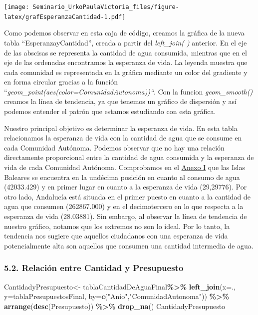 \documentclass[
]{article}
\newenvironment{Shaded}{\begin{snugshade}}{\end{snugshade}}
\newcommand{\AttributeTok}[1]{\textcolor[rgb]{0.13,0.29,0.53}{#1}}
\newcommand{\FunctionTok}[1]{\textcolor[rgb]{0.13,0.29,0.53}{\textbf{#1}}}
\newcommand{\NormalTok}[1]{#1}
\newcommand{\OtherTok}[1]{\textcolor[rgb]{0.56,0.35,0.01}{#1}}
\newcommand{\SpecialCharTok}[1]{\textcolor[rgb]{0.81,0.36,0.00}{\textbf{#1}}}
\newcommand{\StringTok}[1]{\textcolor[rgb]{0.31,0.60,0.02}{#1}}
\begin{document}
\texttt{[image: Seminario\_UrkoPaulaVictoria\_files/figure-latex/grafEsperanzaCantidad-1.pdf]}

Como podemos observar en esta caja de código, creamos la gráfica de la
nueva tabla ``EsperanzayCantidad'', creada a partir del
\emph{left\_join( )} anterior. En el eje de las abscisas se representa
la cantidad de agua consumida, mientras que en el eje de las ordenadas
encontramos la esperanza de vida. La leyenda muestra que cada comunidad
es representada en la gráfica mediante un color del gradiente y en forma
circular gracias a la función
``\emph{geom\_point(aes(color=ComunidadAutonoma))``}. Con la funcion
\emph{geom\_smooth()} creamos la línea de tendencia, ya que tenemos un
gráfico de dispersión y así podemos entender el patrón que estamos
estudiando con esta gráfica.

Nuestro principal objetivo es determinar la esperanza de vida. En esta
tabla relacionamos la esperanza de vida con la cantidad de agua que se
consume en cada Comunidad Autónoma. Podemos observar que no hay una
relación directamente proporcional entre la cantidad de agua consumida y
la esperanza de vida de cada Comunidad Autónoma. Comprobamos en el
\protect\hyperlink{anexo}{Anexo I} que las Islas Baleares se encuentra
en la undécima posición en cuanto al consumo de agua (42033.429) y en
primer lugar en cuanto a la esperanza de vida (29,29776). Por otro lado,
Andalucía está situada en el primer puesto en cuanto a la cantidad de
agua que consumen (262867.000) y en el decimotercero en lo que respecta
a la esperanza de vida (28.03881). Sin embargo, al observar la línea de
tendencia de nuestro gráfico, notamos que los extremos no son lo ideal.
Por lo tanto, la tendencia nos sugiere que aquellos ciudadanos con una
esperanza de vida potencialmente alta son aquellos que consumen una
cantidad intermedia de agua.

\hypertarget{relaciuxf3n-entre-cantidad-y-presupuesto}{%
\subsubsection{5.2. Relación entre Cantidad y
Presupuesto}\label{relaciuxf3n-entre-cantidad-y-presupuesto}}

\begin{Shaded}
\begin{Highlighting}[]
\NormalTok{CantidadyPresupuesto}\OtherTok{\textless{}{-}}\NormalTok{ tablaCantidadDeAguaFinal}\SpecialCharTok{\%\textgreater{}\%} 
  \FunctionTok{left\_join}\NormalTok{(}\AttributeTok{x=}\NormalTok{., }\AttributeTok{y=}\NormalTok{tablaPresupuestosFinal, }\AttributeTok{by=}\FunctionTok{c}\NormalTok{(}\StringTok{"Anio"}\NormalTok{,}\StringTok{"ComunidadAutonoma"}\NormalTok{)) }\SpecialCharTok{\%\textgreater{}\%} 
  \FunctionTok{arrange}\NormalTok{(}\FunctionTok{desc}\NormalTok{(Presupuesto)) }\SpecialCharTok{\%\textgreater{}\%}
  \FunctionTok{drop\_na}\NormalTok{()}
\NormalTok{CantidadyPresupuesto}
\end{Highlighting}
\end{Shaded}
\end{document}
